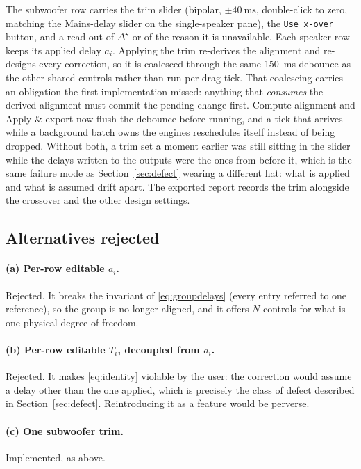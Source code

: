 \documentclass[11pt,a4paper]{article}
\newcommand{\code}[1]{\texttt{\small #1}}
\begin{document}
The subwoofer row carries the trim slider (bipolar, $\pm\SI{40}{\milli\second}$,
double-click to zero, matching the Mains-delay slider on the single-speaker
pane), the \code{Use x-over} button, and a read-out of $\Delta^\star$ or of the
reason it is unavailable. Each speaker row keeps its applied delay $a_i$.
Applying the trim re-derives the alignment and re-designs every correction, so it
is coalesced through the same \SI{150}{\milli\second} debounce as the other
shared controls rather than run per drag tick. That coalescing carries an
obligation the first implementation missed: anything that \emph{consumes} the
derived alignment must commit the pending change first. Compute alignment and
Apply \& export now flush the debounce before running, and a tick that arrives
while a background batch owns the engines reschedules itself instead of being
dropped. Without both, a trim set a moment earlier was still sitting in the
slider while the delays written to the outputs were the ones from before it,
which is the same failure mode as Section~\ref{sec:defect} wearing a different
hat: what is applied and what is assumed drift apart. The exported report records the
trim alongside the crossover and the other design settings.

\subsection{Alternatives rejected}

\paragraph{(a) Per-row editable $a_i$.} Rejected. It breaks the invariant of
\eqref{eq:groupdelays} (every entry referred to one reference), so the group
is no longer aligned, and it offers $N$ controls for what is one physical degree
of freedom.

\paragraph{(b) Per-row editable $T_i$, decoupled from $a_i$.} Rejected. It makes
\eqref{eq:identity} violable by the user: the correction would assume a delay
other than the one applied, which is precisely the class of defect described in
Section~\ref{sec:defect}. Reintroducing it as a feature would be perverse.

\paragraph{(c) One subwoofer trim.} Implemented, as above.
\end{document}
